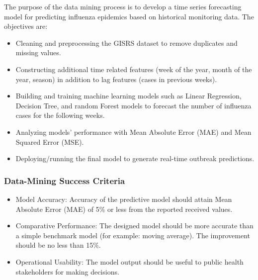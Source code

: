 The purpose of the data mining process is to develop a time series forecasting model for predicting influenza epidemics based on historical monitoring data. The objectives are:
\begin{itemize}
  \item Cleaning and preprocessing the GISRS dataset to remove duplicates and missing values.
  \item Constructing additional time related features (week of the year, month of the year, season) in addition to lag features (cases in previous weeks).
  \item Building and training machine learning models such as Linear Regression, Decision Tree, and random Forest models to forecast the number of influenza cases for the following weeks.
  \item Analyzing models' performance with Mean Absolute Error (MAE) and Mean Squared Error (MSE).
  \item Deploying/running the final model to generate real-time outbreak predictions.
\end{itemize}

\subsubsection*{Data-Mining Success Criteria}

\begin{itemize}
  \item Model Accuracy: Accuracy of the predictive model should attain Mean Absolute Error (MAE) of 5\% or less from the reported received values.
  \item Comparative Performance: The designed model should be more accurate than a simple benchmark model (for example: moving average). The improvement should be no less than 15\%.
  \item Operational Usability: The model output should be useful to public health stakeholders for making decisions.
\end{itemize}

